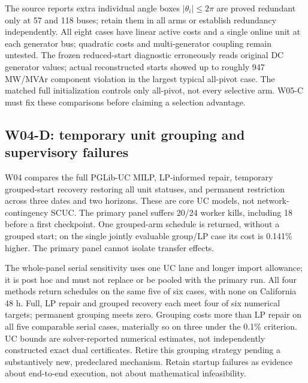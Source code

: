 \documentclass[11pt,letterpaper]{article}
\begin{document}
The source reports extra individual angle boxes $|\theta_i|\le2\pi$ are proved redundant only at 57 and 118 buses; retain them in all arms or establish redundancy independently. All eight cases have linear active costs and a single online unit at each generator bus; quadratic costs and multi-generator coupling remain untested. The frozen reduced-start diagnostic erroneously reads original DC generator values; actual reconstructed starts showed up to roughly 947 MW/MVAr component violation in the largest typical all-pivot case. The matched full initialization controls only all-pivot, not every selective arm. W05-C must fix these comparisons before claiming a selection advantage.

\subsection{W04-D: temporary unit grouping and supervisory failures}
W04 compares the full PGLib-UC MILP, LP-informed repair, temporary grouped-start recovery restoring all unit statuses, and permanent restriction across three dates and two horizons. These are core UC models, not network-contingency SCUC. The primary panel suffers 20/24 worker kills, including 18 before a first checkpoint. One grouped-arm schedule is returned, without a grouped start; on the single jointly evaluable group/LP case its cost is 0.141\% higher. The primary panel cannot isolate transfer effects.

The whole-panel serial sensitivity uses one UC lane and longer import allowance; it is post hoc and must not replace or be pooled with the primary run. All four methods return schedules on the same five of six cases, with none on California 48 h. Full, LP repair and grouped recovery each meet four of six numerical targets; permanent grouping meets zero. Grouping costs more than LP repair on all five comparable serial cases, materially so on three under the 0.1\% criterion. UC bounds are solver-reported numerical estimates, not independently constructed exact dual certificates. Retire this grouping strategy pending a substantively new, predeclared mechanism. Retain startup failures as evidence about end-to-end execution, not about mathematical infeasibility.
\end{document}
